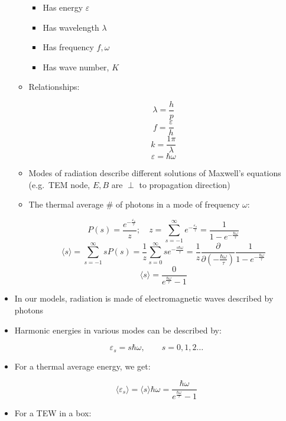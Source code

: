\begin{itemize}
\begin{itemize}
\begin{itemize}
          \item Has energy $\varepsilon$

          \item Has wavelength $\lambda$

          \item Has frequency $f,\omega$

          \item Has wave number, $K$

        \end{itemize}

      \item Relationships:

        $$\lambda=\frac{h}{p}$$
        $$f=\frac{\varepsilon}{h}$$
        $$k=\frac{1\pi}{\lambda}$$
        $$\boxed{\varepsilon=\hbar\omega}$$

      \item Modes of radiation describe different solutions of Maxwell's equations (e.g.\ TEM node, $E,B$ are $\perp$ to propagation direction)

      \item The thermal average \# of photons in a mode of frequency $\omega$:

        $$P(s)=\frac{e^{-\frac{\varepsilon_s}{\tau}}}{z};\quad z=\sum_{s=-1}^\infty e^{-\frac{\varepsilon_s}{\tau}}=\frac{1}{1-e^{-\frac{\hbar\omega}{\tau}}}$$
        $$\langle s\rangle=\sum_{s=-1}^\infty sP(s)=\frac{1}{z}\sum_{s=0}^\infty se^{-\frac{s\hbar\omega}{\tau}}=\frac{1}{z}\frac{\partial}{\partial\left( -\frac{\hbar\omega}{\tau} \right)}\frac{1}{1-e^{-\frac{\hbar\omega}{\tau}}}$$
        $$\langle s\rangle=\frac{0}{e^{\frac{\hbar\omega}{\tau}}-1}$$

    \end{itemize}

  \item In our models, radiation is made of electromagnetic waves described by photons

  \item Harmonic energies in various modes can be described by:

    $$\varepsilon_s=s\hbar\omega,\quad\quad s=0,1,2\ldots$$

  \item For a thermal average energy, we get:

    $$\langle \varepsilon_s\rangle=\langle s\rangle\hbar\omega=\frac{\hbar\omega}{e^{\frac{\hbar\omega}{\tau}}-1}$$

  \item For a TEW in a box:


\end{itemize}
